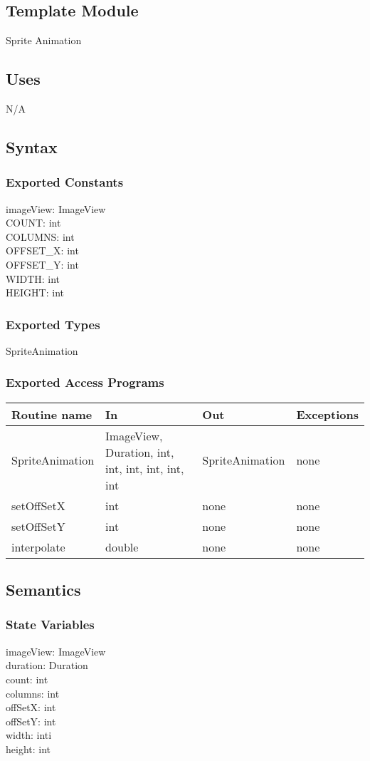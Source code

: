 \documentclass[12pt, titlepage]{article}
\begin{document}
\subsection{Template Module}
Sprite Animation
\subsection {Uses}
N/A
\subsection {Syntax}
\subsubsection {Exported Constants}
imageView: ImageView\\
COUNT: int\\
COLUMNS: int\\
OFFSET\_X: int\\
OFFSET\_Y: int\\
WIDTH: int\\
HEIGHT: int\\
\subsubsection {Exported Types}
SpriteAnimation 
\subsubsection {Exported Access Programs}
\begin{tabular}{| l | l | l | l |}
\hline
\textbf{Routine name} & \textbf{In} & \textbf{Out} & \textbf{Exceptions}\\
\hline
SpriteAnimation & ImageView, Duration, int, int, int, int, int, int & SpriteAnimation & none\\
\hline
setOffSetX & int & none & none\\
\hline
setOffSetY & int & none & none\\
\hline
interpolate & double & none & none\\
\hline
\end{tabular}
\subsection {Semantics}
\subsubsection {State Variables}
imageView: ImageView\\
duration: Duration\\
count: int\\
columns: int\\
offSetX: int\\
offSetY: int\\
width: inti\\
height: int\\
\end{document}
